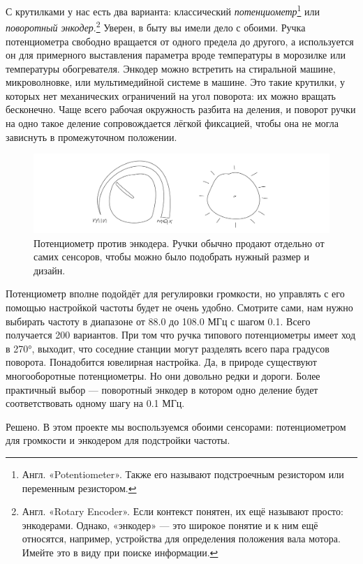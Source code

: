 С крутилками у нас есть два варианта: классический \emph{потенциометр}\footnote{Англ. «Potentiometer». Также его называют подстроечным резистором или переменным резистором.} или \emph{поворотный энкодер}.\footnote{Англ. «Rotary Encoder». Если контекст понятен, их ещё называют просто: энкодерами. Однако, «энкодер» — это широкое понятие и к ним ещё относятся, например, устройства для определения положения вала мотора.  Имейте это в виду при поиске информации.} Уверен, в быту вы имели дело с обоими. Ручка потенциометра свободно вращается от одного предела до другого, а используется он для примерного выставления параметра вроде температуры в морозилке или температуры обогревателя. Энкодер можно встретить на стиральной машине, микроволновке, или мультимедийной системе в машине. Это такие крутилки, у которых нет механических ограничений на угол поворота: их можно вращать бесконечно. Чаще всего рабочая окружность разбита на деления, и поворот ручки на одно такое деление сопровождается лёгкой фиксацией, чтобы она не могла зависнуть в промежуточном положении.

\begin{figure}
  \centering
  \includegraphics{sketches/pot-vs-encoder}
  \caption{Потенциометр против энкодера. Ручки обычно продают отдельно от самих сенсоров, чтобы можно было подобрать нужный размер и дизайн.}
\end{figure}

Потенциометр вполне подойдёт для регулировки громкости, но управлять с его помощью настройкой частоты будет не очень удобно. Смотрите сами, нам нужно выбирать частоту в диапазоне от 88.0 до 108.0 МГц с шагом 0.1. Всего получается 200 вариантов. При том что ручка типового потенциометры имеет ход в 270°, выходит, что соседние станции могут разделять всего пара градусов поворота. Понадобится ювелирная настройка. Да, в природе существуют многооборотные потенциометры. Но они довольно редки и дороги. Более практичный выбор — поворотный энкодер в котором одно деление будет соответствовать одному шагу на 0.1 МГц.

Решено. В этом проекте мы воспользуемся обоими сенсорами: потенциометром для громкости и энкодером для подстройки частоты.

